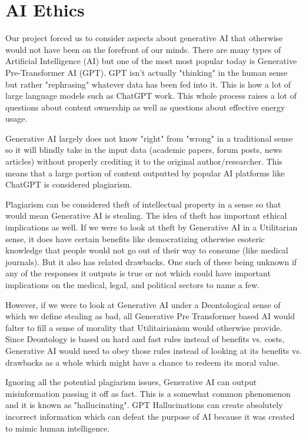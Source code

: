 \documentclass[letterpaper,11pt,leqno]{article}
\begin{document}
\section{AI Ethics}

Our project forced us to consider aspects about generative AI that otherwise would not have been on the forefront of our minds. There are many types of Artificial Intelligence (AI) but one of the most most popular today is Generative Pre-Transformer AI (GPT). GPT isn't actually "thinking" in the human sense but rather "rephrasing" whatever data has been fed into it. This is how a lot of large language models such as ChatGPT work. This whole process raises a lot of questions about content ownership as well as questions about effective energy usage.

Generative AI largely does not know "right" from "wrong" in a traditional sense so it will blindly take in the input data (academic papers, forum posts, news articles) without properly crediting it to the original author/researcher. This means that a large portion of content outputted by popular AI platforms like ChatGPT is considered plagiarism.

Plagiarism can be considered theft of intellectual property in a sense so that would mean Generative AI is stealing. The idea of theft has important ethical implications as well. If we were to look at theft by Generative AI in a Utilitarian sense, it does have certain benefits like democratizing otherwise esoteric knowledge that people would not go out of their way to consume (like medical journals). But it also has related drawbacks. One such of these being unknown if any of the responses it outputs is true or not which could have important implications on the medical, legal, and political sectors to name a few.

However, if we were to look at Generative AI under a Deontological sense of which we define stealing as bad, all Generative Pre Transformer based AI would falter to fill a sense of morality that Utilitairianism would otherwise provide. Since Deontology is based on hard and fast rules instead of benefits vs. costs, Generative AI would need to obey those rules instead of looking at its benefits vs. drawbacks as a whole which might have a chance to redeem its moral value.

Ignoring all the potential plagiarism issues, Generative AI can output misinformation passing it off as fact. This is a somewhat common phenomenon and it is known as "hallucinating". GPT Hallucinations can create absolutely incorrect information which can defeat the purpose of AI because it was created to mimic human intelligence.
\end{document}
